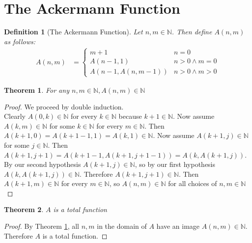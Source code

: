 \documentclass[12pt, letterpaper]{article}
\newtheorem{theorem}{Theorem}
\newtheorem*{definition}{Definition}
\theoremstyle{case}
\begin{document}
  \section{The Ackermann Function}
    \begin{definition}[The Ackermann Function]
      Let $n, m \in \mathbb{N}$. Then define $A(n, m)$ as follows:
      \begin{equation*}
        \begin{aligned}
          A(n, m) &=
          \begin{cases}
            m + 1                   & n = 0 \\
            A(n - 1, 1)             & n > 0 \wedge m = 0 \\
            A(n - 1, A(n, m - 1))   & n > 0 \wedge m > 0
          \end{cases}
        \end{aligned}
      \end{equation*}
    \end{definition}

    \begin{theorem}
      \label{inN}
      For any $n, m \in \mathbb{N}, A(n, m) \in \mathbb{N}$
    \end{theorem}
    \begin{proof}
      We proceed by double induction. \\
      Clearly $A(0, k) \in \mathbb{N}$ for every $k \in \mathbb{N}$ because $k + 1 \in \mathbb{N}$.
      Now assume $A(k, m) \in \mathbb{N}$ for some $k \in \mathbb{N}$ for every $m \in \mathbb{N}$.
      Then $A(k + 1, 0) = A(k + 1 - 1, 1) = A(k, 1) \in \mathbb{N}$.
      Now assume $A(k + 1, j) \in \mathbb{N}$ for some $j \in \mathbb{N}$.
      Then $A(k + 1, j + 1) = A(k + 1 - 1, A(k + 1, j + 1 - 1)) = A(k, A(k + 1, j))$.
      By our second hypothesis $A(k + 1, j) \in \mathbb{N}$, so by our first hypothesis $A(k, A(k + 1, j)) \in \mathbb{N}$.
      Therefore $A(k + 1, j + 1) \in \mathbb{N}$. Then $A(k + 1, m) \in \mathbb{N}$ for every $m \in \mathbb{N}$, so
      $A(n, m) \in \mathbb{N}$ for all choices of $n, m \in \mathbb{N}$
    \end{proof}

    \begin{theorem}
      $A$ is a total function
    \end{theorem}
    \begin{proof}
      By Theorem \ref{inN}, all $n, m$ in the domain of $A$ have an image $A(n, m) \in \mathbb{N}$.
      Therefore $A$ is a total function.
    \end{proof}
\end{document}
